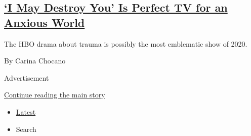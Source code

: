 \begin{enumerate}
  \hypertarget{i-may-destroy-you-is-perfect-tv-for-an-anxious-world}{%
  \subsection{\texorpdfstring{\href{/2020/07/29/magazine/i-may-destroy-you-hbo-michaela-coel.html}{`I
  May Destroy You' Is Perfect TV for an Anxious
  World}}{`I May Destroy You' Is Perfect TV for an Anxious World}}\label{i-may-destroy-you-is-perfect-tv-for-an-anxious-world}}

  The HBO drama about trauma is possibly the most emblematic show of
  2020.

  By Carina Chocano
\end{enumerate}

Advertisement

\protect\hyperlink{after-mid1}{Continue reading the main story}

\begin{itemize}
\tightlist
\item
  \protect\hyperlink{stream-panel}{Latest}
\item
  Search
\end{itemize}

